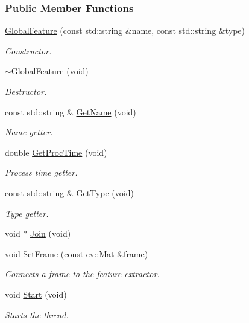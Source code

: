 \subsubsection*{Public Member Functions}
\begin{DoxyCompactItemize}
\item 
\hyperlink{group___feature_extractor_a835e42ce3c2d6b39189a0f2bc24afc9c}{Global\-Feature} (const std\-::string \&name, const std\-::string \&type)
\begin{DoxyCompactList}\small\item\em Constructor. \end{DoxyCompactList}\item 
\hyperlink{group___feature_extractor_a355fe3fc573a603139538394c5404832}{$\sim$\-Global\-Feature} (void)
\begin{DoxyCompactList}\small\item\em Destructor. \end{DoxyCompactList}\item 
const std\-::string \& \hyperlink{group___feature_extractor_a5f69ca2455d5eec4493dbf115d00d5c9}{Get\-Name} (void)
\begin{DoxyCompactList}\small\item\em Name getter. \end{DoxyCompactList}\item 
double \hyperlink{group___feature_extractor_ad07a3104192b50d911eee634a0be009d}{Get\-Proc\-Time} (void)
\begin{DoxyCompactList}\small\item\em Process time getter. \end{DoxyCompactList}\item 
const std\-::string \& \hyperlink{group___feature_extractor_a6724c19006d495bd6a9c8c6029236ebc}{Get\-Type} (void)
\begin{DoxyCompactList}\small\item\em Type getter. \end{DoxyCompactList}\item 
void $\ast$ \hyperlink{group___core_a8f33f7750321d5df9188033e7e3e300d}{Join} (void)
\item 
void \hyperlink{group___feature_extractor_a3c58d995fb2440b28db3b21b54b94815}{Set\-Frame} (const cv\-::\-Mat \&frame)
\begin{DoxyCompactList}\small\item\em Connects a frame to the feature extractor. \end{DoxyCompactList}\item 
void \hyperlink{group___core_a2b42f82341afd2747ea093b6ac8b91cb}{Start} (void)
\begin{DoxyCompactList}\small\item\em Starts the thread. \end{DoxyCompactList}\end{DoxyCompactItemize}
